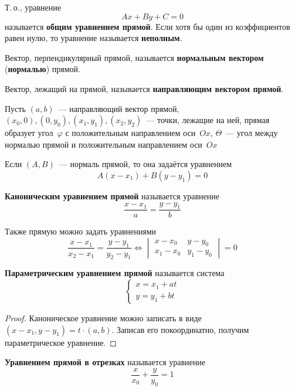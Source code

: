 Т.\,о., уравнение
\begin{equation*}
Ax + By + C = 0
\end{equation*}
называется \textbf{общим уравнением прямой}.
Если хотя бы один из коэффициентов равен нулю, то уравнение называется \textbf{неполным}.

 Вектор, перпендикулярный прямой, называется \textbf{нормальным вектором} (\textbf{нормалью}) прямой.

Вектор, лежащий на прямой, называется \textbf{направляющим вектором прямой}.

Пусть $(a, b)$~--- направляющий вектор прямой, $(x_0, 0), (0, y_0), (x_1, y_1), (x_2, y_2)$~--- точки, лежащие на ней, прямая образует угол~$\varphi$ с положительным направлением оси~$Ox$, $\Theta$~--- угол между нормалью прямой и положительным направлением оси~$Ox$

Если $(A, B)$~--- нормаль прямой, то она задаётся уравнением
\begin{equation*}
A(x - x_1) + B(y - y_1) = 0
\end{equation*}

\textbf{Каноническим уравнением прямой} называется уравнение
\begin{equation*}
\frac{x - x_1}a = \frac{y - y_1}b
\end{equation*}

Также прямую можно задать уравнениями
\begin{equation*}
\frac{x - x_1}{x_2 - x_1} = \frac{y - y_1}{y_2 - y_1} \Leftrightarrow
\begin{vmatrix}
x - x_0 & y - y_0 \\
x_1 - x_0 & y_1 - y_0
\end{vmatrix} = 0
\end{equation*}

\textbf{Параметрическим уравнением прямой} называется система
\begin{equation*}
\begin{cases}
x = x_1 + at \\
y = y_1 + bt
\end{cases}
\end{equation*}
\begin{proof}
Каноническое уравнение можно записать в виде $(x - x_1, y - y_1) = t \cdot (a, b)$.
Записав его покоординатно, получим параметрическое уравнение.
\end{proof}

\textbf{Уравнением прямой в отрезках} называется уравнение
\begin{equation*}
\frac{x}{x_0} + \frac{y}{y_0} = 1
\end{equation*}

